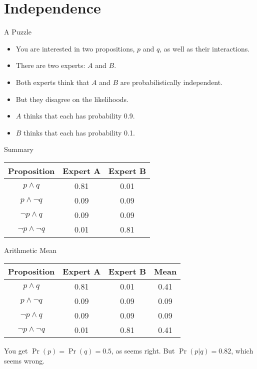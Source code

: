 \documentclass[
  ignorenonframetext,
]{beamer}
\providecommand{\tightlist}{%
  \setlength{\itemsep}{0pt}\setlength{\parskip}{0pt}}
\begin{document}
\hypertarget{independence}{%
\section{Independence}\label{independence}}

\begin{frame}{A Puzzle}
\protect\hypertarget{a-puzzle}{}
\begin{itemize}
\tightlist
\item
  You are interested in two propositions, \(p\) and \(q\), as well as
  their interactions.
\item
  There are two experts: \(A\) and \(B\).
\item
  Both experts think that \(A\) and \(B\) are probabilistically
  independent.
\item
  But they disagree on the likelihoods.
\item
  \(A\) thinks that each has probability 0.9.
\item
  \(B\) thinks that each has probability 0.1.
\end{itemize}
\end{frame}

\begin{frame}{Summary}
\protect\hypertarget{summary}{}
\begin{longtable}[]{@{}ccc@{}}
\toprule
Proposition & Expert A & Expert B \\
\midrule
\endhead
\(p \wedge q\) & 0.81 & 0.01 \\
\(p \wedge \neg q\) & 0.09 & 0.09 \\
\(\neg p \wedge q\) & 0.09 & 0.09 \\
\(\neg p \wedge \neg q\) & 0.01 & 0.81 \\
\bottomrule
\end{longtable}
\end{frame}

\begin{frame}{Arithmetic Mean}
\protect\hypertarget{arithmetic-mean}{}
\begin{longtable}[]{@{}cccc@{}}
\toprule
Proposition & Expert A & Expert B & Mean \\
\midrule
\endhead
\(p \wedge q\) & 0.81 & 0.01 & 0.41 \\
\(p \wedge \neg q\) & 0.09 & 0.09 & 0.09 \\
\(\neg p \wedge q\) & 0.09 & 0.09 & 0.09 \\
\(\neg p \wedge \neg q\) & 0.01 & 0.81 & 0.41 \\
\bottomrule
\end{longtable}

You get \(\Pr(p) = \Pr(q) = 0.5\), as seems right. But
\(\Pr(p | q) = 0.82\), which seems wrong.
\end{frame}
\end{document}
